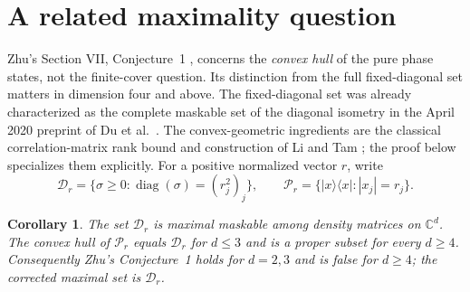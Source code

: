 \documentclass[11pt]{article}
\newtheorem{corollary}[theorem]{Corollary}
\newcommand{\C}{\mathbb C}
\newcommand{\diag}{\operatorname{diag}}
\begin{document}
\section{A related maximality question}
Zhu's Section VII, Conjecture~1 \cite{zhu}, concerns the \emph{convex hull}
of the pure phase states, not the finite-cover question. Its distinction
from the full fixed-diagonal set matters in dimension four and above.
The fixed-diagonal set was already characterized as the complete maskable
set of the diagonal isometry in the April 2020 preprint of
Du et al.\ \cite[arXiv version, Theorem 3.2]{du}.
The convex-geometric ingredients are the classical correlation-matrix
rank bound and construction of Li and Tam
\cite[Theorem 1, Corollary 2 and Section 2.1]{litam}; the proof below
specializes them explicitly.
For a positive normalized vector $r$, write
\[
 \mathcal D_r=\{\sigma\ge0:\diag(\sigma)=(r_j^2)_j\},\qquad
 \mathcal P_r=\{|x\rangle\langle x|:|x_j|=r_j\}.
\]
\begin{corollary}\label{cor:maximal}
The set $\mathcal D_r$ is maximal maskable among density matrices on
$\C^d$. The convex hull of $\mathcal P_r$ equals $\mathcal D_r$ for
$d\le3$ and is a proper subset for every $d\ge4$.
Consequently Zhu's Conjecture~1 holds for $d=2,3$ and is false for $d\ge4$;
the corrected maximal set is $\mathcal D_r$.
\end{corollary}
\end{document}
